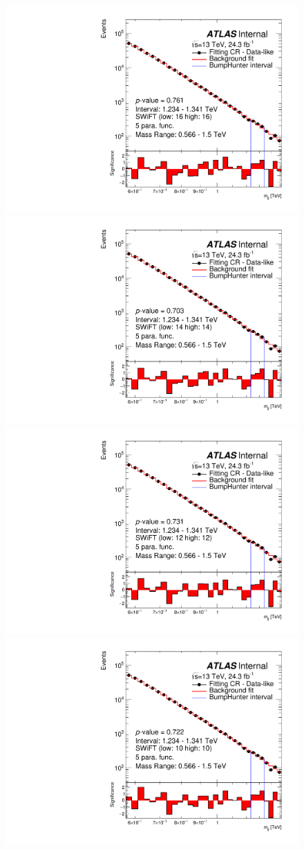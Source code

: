 \begin{figure}
\captionsetup[subfigure]{aboveskip=0pt,justification=centering}
 {
  \includegraphics[width=0.48\linewidth, angle=0]{figs/Dibjet/LowMass/FitStudy_min566/bhFit_corrFitCR_dataLike_v13_5para_low16_high16.pdf}
}
 {
  \includegraphics[width=0.48\linewidth, angle=0]{figs/Dibjet/LowMass/FitStudy_min566/bhFit_corrFitCR_dataLike_v13_5para_low14_high14.pdf}
}
 {
  \includegraphics[width=0.48\linewidth, angle=0]{figs/Dibjet/LowMass/FitStudy_min566/bhFit_corrFitCR_dataLike_v13_5para_low12_high12.pdf}
}
 {
  \includegraphics[width=0.48\linewidth, angle=0]{figs/Dibjet/LowMass/FitStudy_min566/bhFit_corrFitCR_dataLike_v13_5para_low10_high10.pdf}
}
\end{figure}
